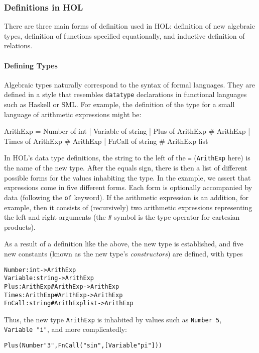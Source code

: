 \documentclass[11pt]{article}
\begin{document}
\subsubsection{Definitions in HOL}
There are three main forms of definition used in HOL: definition of
new algebraic types, definition of functions specified equationally,
and inductive definition of relations.

\paragraph{Defining Types}
Algebraic types naturally correspond to the syntax of formal
languages.  They are defined in a style that resembles
\texttt{datatype} declarations in functional languages such as Haskell
or SML.  For example, the definition of the type for a small language
of arithmetic expressions might be:
\begin{stdrule}
   ArithExp = Number of int
            | Variable of string
            | Plus of ArithExp # ArithExp
            | Times of ArithExp # ArithExp
            | FnCall of string # ArithExp list
\end{stdrule}
In HOL's data type definitions, the string to the left of the
\texttt{=} (\texttt{ArithExp} here) is the name of the new type.
After the equals sign, there is then a list of different possible
forms for the values inhabiting the type.  In the example, we assert
that expressions come in five different forms.  Each form is
optionally accompanied by data (following the \texttt{of} keyword).
If the arithmetic expression is an addition, for example, then it
consists of (recursively) two arithmetic expressions representing the
left and right arguments (the \texttt{\#} symbol is the type operator
for cartesian products).

As a result of a definition like the above, the new type is
established, and five new constants (known as the new type's
\emph{constructors}) are defined, with types
\begin{alltt}
   Number   : int -> ArithExp
   Variable : string -> ArithExp
   Plus     : ArithExp # ArithExp -> ArithExp
   Times    : ArithExp # ArithExp -> ArithExp
   FnCall   : string # ArithExp list -> ArithExp
\end{alltt}
Thus, the new type \texttt{ArithExp} is inhabited by values such as
\texttt{Number~5}, \texttt{Variable~"i"}, and more complicatedly:
\begin{alltt}
   Plus (Number "3", FnCall ("sin", [Variable "pi"]))
\end{alltt}
\end{document}
